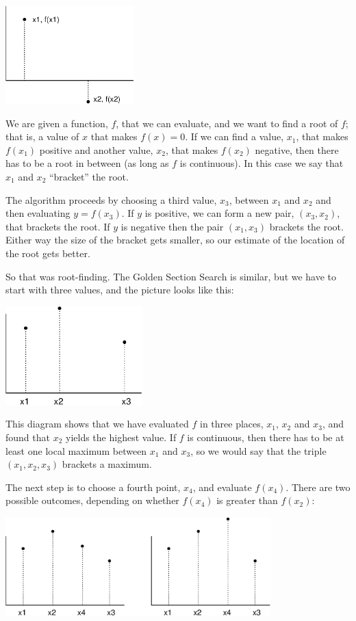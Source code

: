 \documentclass{book}
\begin{document}
\beforefig \centerline{\includegraphics[height=1.5in]{figs/secant.eps}}

We are given a function, $f$, that we can evaluate, and
we want to find a root of $f$; that is, a value of $x$ that makes
$f(x)=0$. If we can find a value, $x_1$, that makes $f(x_1)$ positive
and another value, $x_2$, that makes $f(x_2)$ negative, then there has
to be a root in between (as long as $f$ is continuous). In this
case we say that $x_1$ and $x_2$ ``bracket'' the root.

The algorithm proceeds by choosing a third value, $x_3$, between
$x_1$ and $x_2$ and then evaluating $y = f(x_3)$. If $y$ is
positive, we can form a new pair, $(x_3, x_2)$, that brackets the
root. If $y$ is negative then the pair $(x_1, x_3)$ brackets the root.
Either way the size of the bracket gets smaller, so our
estimate of the location of the root gets better.

So that was root-finding. The Golden Section Search is similar, but
we have to start with three values, and the picture looks like
this:

\beforefig \centerline{\includegraphics[height=1.5in]{figs/golden1.eps}}

This diagram shows that we have evaluated $f$ in three places,
$x_1$, $x_2$ and $x_3$, and found that $x_2$ yields the highest
value. If $f$ is continuous, then there has to be at least one
local maximum between $x_1$ and $x_3$, so we would say that the
triple $(x_1, x_2, x_3)$ brackets a maximum.

The next step is to choose a fourth point, $x_4$, and evaluate
$f(x_4)$. There are two possible outcomes, depending on whether
$f(x_4)$ is greater than $f(x_2)$:

\beforefig \centerline{\includegraphics[height=1.5in]{figs/golden2.eps}}
\end{document}
